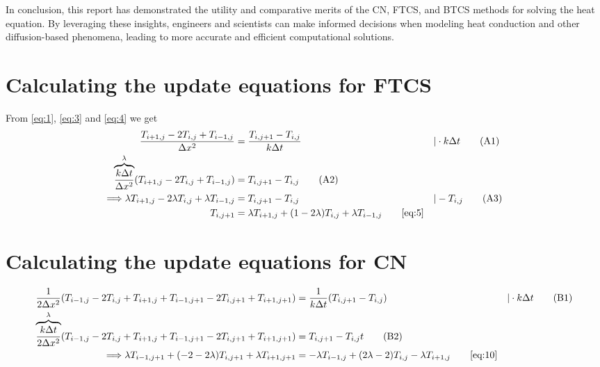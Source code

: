 \documentclass[a4paper]{article} %
\begin{document}
In conclusion, this report has demonstrated the utility and comparative merits of the CN, FTCS, and BTCS methods for solving the heat equation. By leveraging these insights, engineers and scientists can make informed decisions when modeling heat conduction and other diffusion-based phenomena, leading to more accurate and efficient computational solutions.

\newpage

\printbibliography


\begin{appendices}

\section{Calculating the update equations for FTCS}
\label{appendix:math1}
From \eqref{eq:1}, \eqref{eq:3} and \eqref{eq:4} we get
\begin{align*}
\frac{T_{i+1,j} - 2T_{i,j} + T_{i-1,j}}{\Delta x^2} &= \frac{T_{i,j+1} - T_{i,j}}{k\Delta t} &&| \cdot k\Delta t \tag*{(A1)}\\
\overbrace{\frac{k\Delta t}{\Delta x^2}}^{\lambda}(T_{i+1,j} - 2T_{i,j} + T_{i-1,j}) &= T_{i,j+1} - T_{i,j} \tag*{(A2)}\\
\Longrightarrow \lambda T_{i+1,j} - 2 \lambda T_{i,j} + \lambda T_{i-1,j} &= T_{i,j+1} - T_{i,j} &&| -T_{i,j} \tag*{(A3)}\\
T_{i,j+1} &= \lambda T_{i+1,j} + (1 - 2 \lambda)T_{i,j} + \lambda T_{i-1,j} \tag*{\eqref{eq:5}} 
\end{align*}

\section{Calculating the update equations for CN}
\label{appendix:math2}
\begin{align}
\frac{1}{2\Delta x^2}(T_{i-1,j} - 2T_{i,j} + T_{i+1,j} + T_{i-1,j+1} - 2T_{i,j+1} + T_{i+1,j+1}) &= \frac{1}{k\Delta t} (T_{i,j+1} - T_{i,j}) &&|\cdot k\Delta t\tag*{(B1)} \\
\overbrace{\frac{k\Delta t}{2\Delta x^2}}^\lambda(T_{i-1,j} - 2T_{i,j} + T_{i+1,j} + T_{i-1,j+1} - 2T_{i,j+1} + T_{i+1,j+1}) &= T_{i,j+1} - T_{i,j} t\tag*{(B2)} \\
\Longrightarrow \lambda T_{i-1,j+1} + (- 2 - 2\lambda)T_{i,j+1} + \lambda T_{i+1,j+1} &= -\lambda T_{i-1,j} + (2\lambda - 2)T_{i,j} - \lambda T_{i+1,j} \tag*{\eqref{eq:10}}
\end{align}


\end{appendices}
\end{document}
